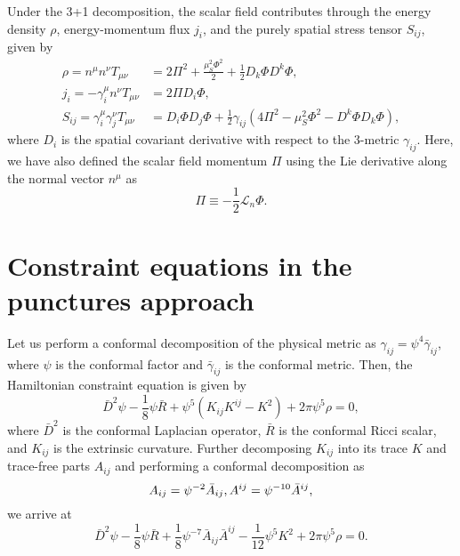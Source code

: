 Under the 3+1 decomposition,
the scalar field contributes through the energy density $\rho$,
energy-momentum flux $j_i$,
and the purely spatial stress tensor $S_{ij}$, given by
\begin{align}
    \rho = n^\mu n^\nu T_{\mu\nu}
    &= 2 \Pi^2 + \frac{\mu_S^2 \Phi^2}{2}
    + \frac{1}{2} D_k\Phi D^k \Phi,
    \\
    j_i = -\gamma_i^\mu n^\nu T_{\mu\nu}
    &= 2\Pi D_i\Phi,
    \\
    S_{ij} = \gamma_i ^\mu \gamma_j^\nu T_{\mu\nu}
    &= D_i\Phi D_j\Phi
    + \frac{1}{2} \gamma_{ij} (4\Pi^2 - \mu_S^2 \Phi^2 - D^k\Phi D_k\Phi),
\end{align}
where $D_i$ is the spatial covariant derivative with respect to the 3-metric $\gamma_{ij}$.
Here, we have also defined the scalar field momentum $\Pi$ using the Lie derivative along the normal vector $n^\mu$ as
\begin{equation}
    \Pi \equiv - \frac{1}{2} \mathcal{L}_n \Phi.
\end{equation}

\section{Constraint equations in the punctures approach}

Let us perform a conformal decomposition of the physical metric as $\gamma_{ij}=\psi^4\bar{\gamma}_{ij}$,
where $\psi$ is the conformal factor and $\bar{\gamma}_{ij}$ is the conformal metric.
Then, the Hamiltonian constraint equation is given by
\begin{equation}
    \bar{D}^2 \psi - \frac{1}{8} \psi \bar{R} + \psi^5 (K_{ij}K^{ij} - K^2 )
    + 2\pi\psi^5 \rho = 0,
\end{equation}
where $\bar{D}^2$ is the conformal Laplacian operator, $\bar{R}$ is the conformal Ricci scalar, and $K_{ij}$ is the extrinsic curvature.
Further decomposing $K_{ij}$ into its trace $K$ and trace-free parts $A_{ij}$ and performing a conformal decomposition as
\begin{equation}
    A_{ij} = \psi^{-2}\bar{A}_{ij},
    \hfill
    A^{ij} = \psi^{-10}\bar{A}^{ij},
\end{equation}
we arrive at
\begin{equation}
    \bar{D}^2 \psi
    - \frac{1}{8} \psi \bar{R}
    + \frac{1}{8} \psi^{-7} \bar{A}_{ij}\bar{A}^{ij}
    - \frac{1}{12} \psi^5 K^2
    + 2\pi\psi^5 \rho = 0.
\end{equation}



